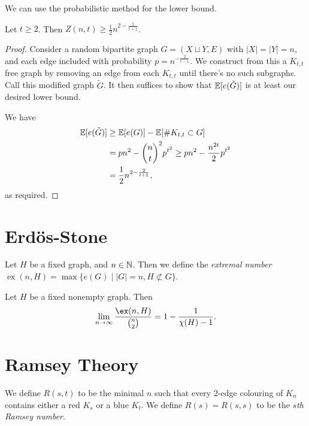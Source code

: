 \documentclass[a3paper, 10pt]{article}
\renewcommand{\vocab}[1]{\emph{#1}}
\begin{document}
\begin{multicols*}{5}
We can use the probabilistic method for the lower bound.

\begin{theorem}
    Let $t \geq 2$. Then $Z(n, t) \geq \frac{1}{2} n^{2 - \frac{2}{t + 1}}$.
\end{theorem}
\begin{proof}
Consider a random bipartite graph $G = (X \sqcup Y, E)$ with $|X| = |Y| = n$, and each edge included with probability $p = n^{- \frac{2}{t - 1}}$. We construct from this a $K_{t, t}$ free graph by removing an edge from each $K_{t, t}$ until there's no such subgraphs. Call this modified graph $\tilde{G}$. It then suffices to show that $\mathbb{E}[e(\tilde{G})]$ is at least our desired lower bound. 

We have
\begin{align*}
    \mathbb{E}[e(\tilde G)] &\geq \mathbb{E}[e(G)] - \mathbb{E}[\# K_{t, t} \subset G] \\
    &= p n^2 - \binom{n}{t}^2 p^{t^2} \geq p n^2 - \frac{n^{2t}}{2} p^{t^2} \\
    &= \frac{1}{2} n^{2 - \frac{2}{t + 1}},
\end{align*}
as required.
\end{proof}


\section{Erd\"os-Stone}

\begin{definition}
    Let $H$ be a fixed graph, and $n \in \mathbb{N}$. Then we define the \vocab{extremal number} $\operatorname{ex}(n, H) = \max \{e(G) \mid |G| = n, H \not \subset G\}$.
\end{definition}


\begin{theorem}
    Let $H$ be a fixed nonempty graph. Then
    \begin{align*}
        \lim_{n \to \infty} \frac{\ex(n, H)}{\binom{n}{2}} = 1 - \frac{1}{\chi(H) - 1}.
    \end{align*}
\end{theorem}

\section{Ramsey Theory}

\begin{definition}
    We define $R(s, t)$ to be the minimal $n$ such that every $2$-edge colouring of $K_n$ contains either a red $K_s$ or a blue $K_t$. We define $R(s) = R(s, s)$ to be the \vocab{$s$th Ramsey number}.
\end{definition}


\end{multicols*}
\end{document}
